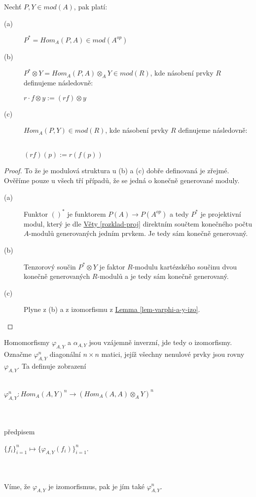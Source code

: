       \begin{lem}
        Nechť $P,Y\in mod(A)$, pak platí:
        \begin{description}
          \item[(a)] $P^*=Hom_A(P,A)\in mod(A^{op})$ 
          \item[(b)] $P^*\otimes Y =Hom_A(P,A)\otimes_A Y \in mod(R)$, kde násobení prvky $R$ definujeme následovně: 
          \\
            \centerline{$r\cdot f\otimes y:=(rf)\otimes y$}  
          \item[(c)] $Hom_A(P,Y)\in mod(R)$, kde násobení prvky $R$ definujeme následovně: 
          \\\\
            \centerline{$(rf)(p):=r(f(p))$}  
        \end{description}
      \end{lem}
      
      \begin{proof}
        To že je modulová struktura u (b) a (c) dobře definovaná je zřejmé. Ověříme 
        pouze u všech tří případů, že se jedná o konečně generované moduly.
        
        \begin{description}          
          \item[(a)] Funktor $()^*$ je funktorem $P(A)\to P(A^{op})$ a tedy $P^*$ 
            je projektivní modul, který je dle \hyperref[rozklad-proj]{Věty \ref*{rozklad-proj}} 
            direktním součtem konečného počtu $A$-modulů generovaných jedním prvkem. 
            Je tedy sám konečně generovaný.
            
          \item[(b)] Tenzorový součin $P^*\otimes Y$ je faktor $R$-modulu kartézského součinu 
             dvou konečně generovaných $R$-modulů a je tedy sám konečně 
             generovaný.
           
          \item[(c)] Plyne z (b) a z izomorfismu z \hyperref[lem-varphi-a-y-izo]{Lemma 
            \ref*{lem-varphi-a-y-izo}}.          
        \end{description}
      \end{proof}      
      
        Homomorfismy $\varphi_{A,Y}$ a $\alpha_{A,Y}$ jsou vzájemně inverzní, 
        jde tedy o izomorfismy. Označme $\varphi_{A,Y}^n$ diagonální $n\times n$ matici, jejíž všechny 
        nenulové prvky jsou rovny $\varphi_{A,Y}$.  Ta definuje zobrazení \\\\
        \centerline{$\varphi_{A,Y}^n:Hom_A(A,Y)^n\rightarrow(Hom_A(A,A)\otimes_A Y)^n$} 
        \\\\
        předpisem \\
        \centerline{$\{f_i\}_{i=1}^n\mapsto \{\varphi_{A,Y}(f_i)\}_{i=1}^n$.}\\\\
        Víme, že $\varphi_{A,Y}$ je izomorfismus, pak je jím také 
        $\varphi^n_{A,Y}$.
        
